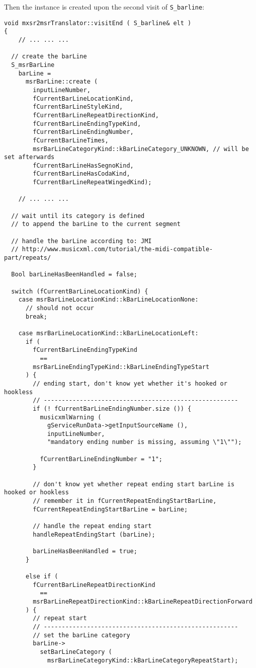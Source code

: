 Then the  instance is created upon the second visit of {\tt S_barline}:%
\begin{lstlisting}[language=CPlusPlus]
void mxsr2msrTranslator::visitEnd ( S_barline& elt )
{
	// ... ... ...

  // create the barLine
  S_msrBarLine
    barLine =
      msrBarLine::create (
        inputLineNumber,
        fCurrentBarLineLocationKind,
        fCurrentBarLineStyleKind,
        fCurrentBarLineRepeatDirectionKind,
        fCurrentBarLineEndingTypeKind,
        fCurrentBarLineEndingNumber,
        fCurrentBarLineTimes,
        msrBarLineCategoryKind::kBarLineCategory_UNKNOWN, // will be set afterwards
        fCurrentBarLineHasSegnoKind,
        fCurrentBarLineHasCodaKind,
        fCurrentBarLineRepeatWingedKind);

	// ... ... ...

  // wait until its category is defined
  // to append the barLine to the current segment

  // handle the barLine according to: JMI
  // http://www.musicxml.com/tutorial/the-midi-compatible-part/repeats/

  Bool barLineHasBeenHandled = false;

  switch (fCurrentBarLineLocationKind) {
    case msrBarLineLocationKind::kBarLineLocationNone:
      // should not occur
      break;

    case msrBarLineLocationKind::kBarLineLocationLeft:
      if (
        fCurrentBarLineEndingTypeKind
          ==
        msrBarLineEndingTypeKind::kBarLineEndingTypeStart
      ) {
        // ending start, don't know yet whether it's hooked or hookless
        // ------------------------------------------------------
        if (! fCurrentBarLineEndingNumber.size ()) {
          musicxmlWarning (
            gServiceRunData->getInputSourceName (),
            inputLineNumber,
            "mandatory ending number is missing, assuming \"1\"");

          fCurrentBarLineEndingNumber = "1";
        }

        // don't know yet whether repeat ending start barLine is hooked or hookless
        // remember it in fCurrentRepeatEndingStartBarLine,
        fCurrentRepeatEndingStartBarLine = barLine;

        // handle the repeat ending start
        handleRepeatEndingStart (barLine);

        barLineHasBeenHandled = true;
      }

      else if (
        fCurrentBarLineRepeatDirectionKind
          ==
        msrBarLineRepeatDirectionKind::kBarLineRepeatDirectionForward
      ) {
        // repeat start
        // ------------------------------------------------------
        // set the barLine category
        barLine->
          setBarLineCategory (
            msrBarLineCategoryKind::kBarLineCategoryRepeatStart);


\end{lstlisting}
